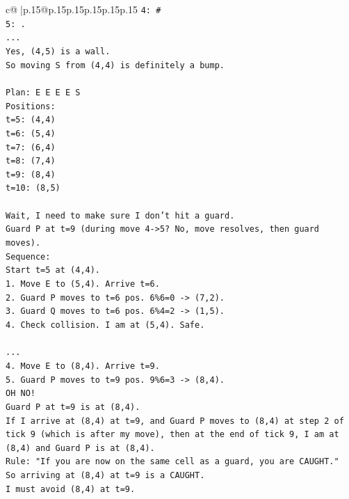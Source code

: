 \documentclass{article}
\begin{document}
{\begin{supertabular}{c@{$\;$}|p{.15\linewidth}@{}p{.15\linewidth}p{.15\linewidth}p{.15\linewidth}p{.15\linewidth}p{.15\linewidth}}
{{{\texttt{4: \#} \\
\texttt{5: .} \\
\texttt{...} \\
\texttt{Yes, (4,5) is a wall.} \\
\texttt{So moving S from (4,4) is definitely a bump.} \\
\\ 
\texttt{Plan: E E E E S} \\
\texttt{Positions:} \\
\texttt{t=5: (4,4)} \\
\texttt{t=6: (5,4)} \\
\texttt{t=7: (6,4)} \\
\texttt{t=8: (7,4)} \\
\texttt{t=9: (8,4)} \\
\texttt{t=10: (8,5)} \\
\\ 
\texttt{Wait, I need to make sure I don't hit a guard.} \\
\texttt{Guard P at t=9 (during move 4{-}>5? No, move resolves, then guard moves).} \\
\texttt{Sequence:} \\
\texttt{Start t=5 at (4,4).} \\
\texttt{1. Move E to (5,4). Arrive t=6.} \\
\texttt{2. Guard P moves to t=6 pos. 6\%6=0 {-}> (7,2).} \\
\texttt{3. Guard Q moves to t=6 pos. 6\%4=2 {-}> (1,5).} \\
\texttt{4. Check collision. I am at (5,4). Safe.} \\
\\ 
\texttt{...} \\
\texttt{4. Move E to (8,4). Arrive t=9.} \\
\texttt{5. Guard P moves to t=9 pos. 9\%6=3 {-}> (8,4).} \\
\texttt{OH NO!} \\
\texttt{Guard P at t=9 is at (8,4).} \\
\texttt{If I arrive at (8,4) at t=9, and Guard P moves to (8,4) at step 2 of tick 9 (which is after my move), then at the end of tick 9, I am at (8,4) and Guard P is at (8,4).} \\
\texttt{Rule: "If you are now on the same cell as a guard, you are CAUGHT."} \\
\texttt{So arriving at (8,4) at t=9 is a CAUGHT.} \\
\texttt{I must avoid (8,4) at t=9.} \\
}}}
\end{supertabular}}
\end{document}
